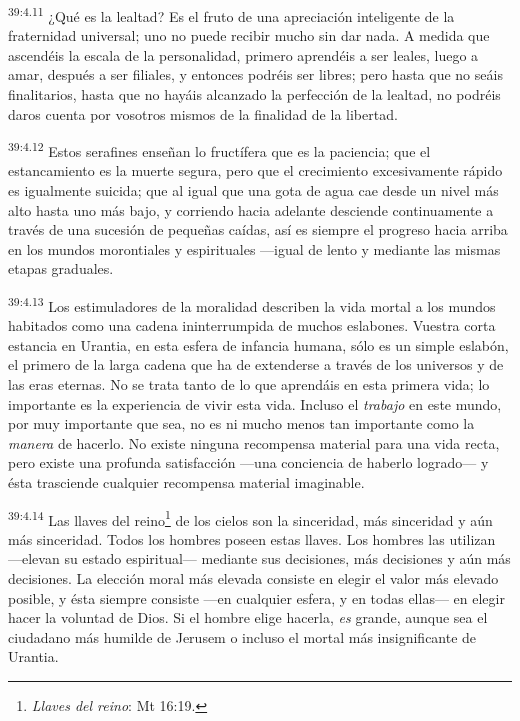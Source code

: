 \par
\textsuperscript{39:4.11} ¿Qué es la lealtad? Es el fruto de una apreciación inteligente de la fraternidad universal; uno no puede recibir mucho sin dar nada. A medida que ascendéis la escala de la personalidad, primero aprendéis a ser leales, luego a amar, después a ser filiales, y entonces podréis ser libres; pero hasta que no seáis finalitarios, hasta que no hayáis alcanzado la perfección de la lealtad, no podréis daros cuenta por vosotros mismos de la finalidad de la libertad.

\par
\textsuperscript{39:4.12} Estos serafines enseñan lo fructífera que es la paciencia; que el estancamiento es la muerte segura, pero que el crecimiento excesivamente rápido es igualmente suicida; que al igual que una gota de agua cae desde un nivel más alto hasta uno más bajo, y corriendo hacia adelante desciende continuamente a través de una sucesión de pequeñas caídas, así es siempre el progreso hacia arriba en los mundos morontiales y espirituales ---igual de lento y mediante las mismas etapas graduales.

\par
\textsuperscript{39:4.13} Los estimuladores de la moralidad describen la vida mortal a los mundos habitados como una cadena ininterrumpida de muchos eslabones. Vuestra corta estancia en Urantia, en esta esfera de infancia humana, sólo es un simple eslabón, el primero de la larga cadena que ha de extenderse a través de los universos y de las eras eternas. No se trata tanto de lo que aprendáis en esta primera vida; lo importante es la experiencia de vivir esta vida. Incluso el \textit{trabajo} en este mundo, por muy importante que sea, no es ni mucho menos tan importante como la \textit{manera} de hacerlo. No existe ninguna recompensa material para una vida recta, pero existe una profunda satisfacción ---una conciencia de haberlo logrado--- y ésta trasciende cualquier recompensa material imaginable.

\par
\textsuperscript{39:4.14} Las llaves del reino\footnote{\textit{Llaves del reino}: Mt 16:19.} de los cielos son la sinceridad, más sinceridad y aún más sinceridad. Todos los hombres poseen estas llaves. Los hombres las utilizan ---elevan su estado espiritual--- mediante sus decisiones, más decisiones y aún más decisiones. La elección moral más elevada consiste en elegir el valor más elevado posible, y ésta siempre consiste ---en cualquier esfera, y en todas ellas--- en elegir hacer la voluntad de Dios. Si el hombre elige hacerla, \textit{es} grande, aunque sea el ciudadano más humilde de Jerusem o incluso el mortal más insignificante de Urantia.

